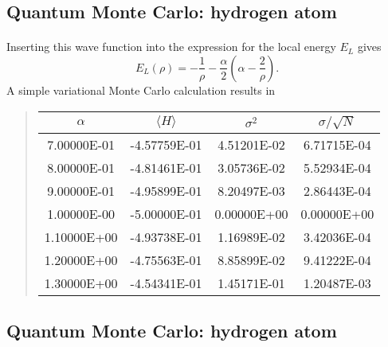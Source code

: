 \documentclass[%
twoside,                 %
final,                   %
10pt]{article}
\begin{document}
\subsection*{Quantum Monte Carlo: hydrogen atom}

\paragraph{}
Inserting this wave function into the expression for the
local energy $E_L$ gives
\[
   E_L(\rho)=-\frac{1}{\rho}-
              \frac{\alpha}{2}\left(\alpha-\frac{2}{\rho}\right).
\]
A simple variational Monte Carlo calculation results in

\begin{quote}
\begin{tabular}{cccc}
\hline
\multicolumn{1}{c}{ $\alpha$ } & \multicolumn{1}{c}{ $\langle H \rangle $ } & \multicolumn{1}{c}{ $\sigma^2$ } & \multicolumn{1}{c}{ $\sigma/\sqrt{N}$ } \\
\hline
7.00000E-01 & -4.57759E-01         & 4.51201E-02 & 6.71715E-04       \\
8.00000E-01 & -4.81461E-01         & 3.05736E-02 & 5.52934E-04       \\
9.00000E-01 & -4.95899E-01         & 8.20497E-03 & 2.86443E-04       \\
1.00000E-00 & -5.00000E-01         & 0.00000E+00 & 0.00000E+00       \\
1.10000E+00 & -4.93738E-01         & 1.16989E-02 & 3.42036E-04       \\
1.20000E+00 & -4.75563E-01         & 8.85899E-02 & 9.41222E-04       \\
1.30000E+00 & -4.54341E-01         & 1.45171E-01 & 1.20487E-03       \\
\hline
\end{tabular}
\end{quote}

\noindent




\subsection*{Quantum Monte Carlo: hydrogen atom}

\paragraph{}
\end{document}
